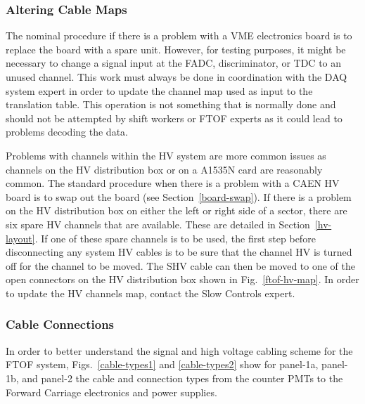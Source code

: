 \documentclass[12pt]{article}
\begin{document}
\subsubsection{Altering Cable Maps}

The nominal procedure if there is a problem with a VME electronics board is to replace the board
with a spare unit. However, for testing purposes, it might be necessary to change a signal input
at the FADC, discriminator, or TDC to an unused channel. This work must always be done in coordination
with the DAQ system expert in order to update the channel map used as input to the translation 
table. This operation is not something that is normally done and should not be attempted by shift
workers or FTOF experts as it could lead to problems decoding the data.

Problems with channels within the HV system are more common issues as channels on the HV distribution
box or on a A1535N card are reasonably common. The standard procedure when there is a problem with
a CAEN HV board is to swap out the board (see Section~\ref{board-swap}). If there is a problem on the HV 
distribution box on either the left or right side of a sector, there are six spare HV channels that 
are available. These are detailed in Section~\ref{hv-layout}. If one of these spare channels is to be 
used, the first step before disconnecting any system HV cables is to be sure that the channel HV is 
turned off for the channel to be moved. The SHV cable can then be moved to one of the open connectors 
on the HV distribution box shown in Fig.~\ref{ftof-hv-map}. In order to update the HV channels map, 
contact the Slow Controls expert.

\subsubsection{Cable Connections}
\label{cable-connections}

In order to better understand the signal and high voltage cabling scheme for the FTOF system,
Figs.~\ref{cable-types1} and \ref{cable-types2} show for panel-1a, panel-1b, and panel-2 the cable 
and connection types from the counter PMTs to the Forward Carriage electronics and power supplies.
\end{document}
